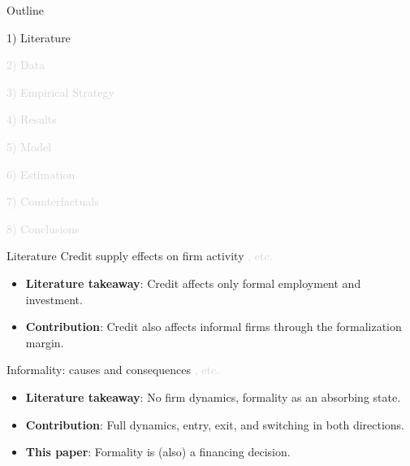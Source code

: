 \documentclass[aspectratio=169]{beamer}
\begin{document}
\begin{frame}[noframenumbering]{Outline}

\Large

1) Literature

\vspace{3mm}

\textcolor{lightgray}{2) Data}

\vspace{3mm}

\textcolor{lightgray}{3) Empirical Strategy}

\vspace{3mm}

\textcolor{lightgray}{4) Results}

\vspace{3mm}

\textcolor{lightgray}{5) Model}

\vspace{3mm}

\textcolor{lightgray}{6) Estimation}

\vspace{3mm}

\textcolor{lightgray}{7) Counterfactuals}

\vspace{3mm}

\textcolor{lightgray}{8) Conclusions}


\end{frame}


\begin{frame}{Literature}\label{literature}
Credit supply effects on firm activity \textcolor{lightgray}{\citep{khwaja2008tracing,chodorow2014employment,amiti2018much,greenstone2020credit,gutierrez2023credit}, etc.}
 \begin{itemize}
    \item \textbf{Literature takeaway}: Credit affects only formal employment and investment.
    \item \textbf{Contribution}: Credit also affects informal firms through the formalization margin.
 \end{itemize}
\vspace{8mm}
\pause
Informality: causes and consequences \textcolor{lightgray}{\citep{la2014informality,meghir2015wages,busso2012formal,almeida2012enforcement,ulyssea2018firms,adom2025structural}, etc.}
\begin{itemize}
    \item \textbf{Literature takeaway}: No firm dynamics, formality as an absorbing state.
     \item \textbf{Contribution}: Full dynamics, entry, exit, and switching in both directions.
 \end{itemize}
\vspace{8mm}
\pause
\begin{itemize}
    \centering
    \item[$\Rightarrow$] \Large \textbf{This paper}: Formality is (also) a financing decision.
\end{itemize}
\end{frame}
\end{document}
